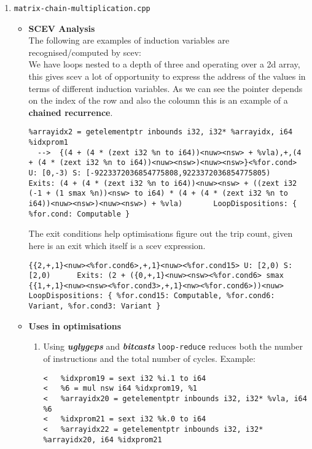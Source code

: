 \documentclass[12pt]{article}
\begin{document}
\begin{enumerate}
\begin{itemize}
\begin{enumerate}
\begin{lstlisting}
\end{lstlisting}
\end{enumerate}
\end{itemize}
\item \texttt{matrix-chain-multiplication.cpp}
\begin{itemize}
\item \textbf{SCEV Analysis}\\
The following are examples of induction variables are recognised/computed by scev:\\
We have loops nested to a depth of three and operating over a 2d array, this gives scev a lot of opportunity to express the address of the values in terms of different induction variables. As we can see the pointer depends on the index of the row and also the coloumn this is an example of a \textbf{chained recurrence}.
\begin{lstlisting}
%arrayidx2 = getelementptr inbounds i32, i32* %arrayidx, i64 %idxprom1
  -->  {(4 + (4 * (zext i32 %n to i64))<nuw><nsw> + %vla),+,(4 + (4 * (zext i32 %n to i64))<nuw><nsw>)<nuw><nsw>}<%for.cond> U: [0,-3) S: [-9223372036854775808,9223372036854775805)		Exits: (4 + (4 * (zext i32 %n to i64))<nuw><nsw> + ((zext i32 (-1 + (1 smax %n))<nsw> to i64) * (4 + (4 * (zext i32 %n to i64))<nuw><nsw>)<nuw><nsw>) + %vla)		LoopDispositions: { %for.cond: Computable }
\end{lstlisting}
The exit conditions help optimisations figure out the trip count, given here is an exit which itself is a scev expression.
\begin{lstlisting}
{{2,+,1}<nuw><%for.cond6>,+,1}<nuw><%for.cond15> U: [2,0) S: [2,0)		Exits: (2 + ({0,+,1}<nuw><nsw><%for.cond6> smax {{1,+,1}<nuw><nsw><%for.cond3>,+,1}<nw><%for.cond6>))<nuw>		LoopDispositions: { %for.cond15: Computable, %for.cond6: Variant, %for.cond3: Variant }
\end{lstlisting}
\item \textbf{Uses in optimisations}
\begin{enumerate}
\item Using \textbf{\textit{uglygeps}} and \textbf{\textit{bitcasts}} \texttt{loop-reduce} reduces both the number of instructions and the total number of cycles. Example:
\begin{lstlisting}
<   %idxprom19 = sext i32 %i.1 to i64
<   %6 = mul nsw i64 %idxprom19, %1
<   %arrayidx20 = getelementptr inbounds i32, i32* %vla, i64 %6
<   %idxprom21 = sext i32 %k.0 to i64
<   %arrayidx22 = getelementptr inbounds i32, i32* %arrayidx20, i64 %idxprom21

\end{lstlisting}
\end{enumerate}
\end{itemize}
\end{enumerate}
\end{document}

